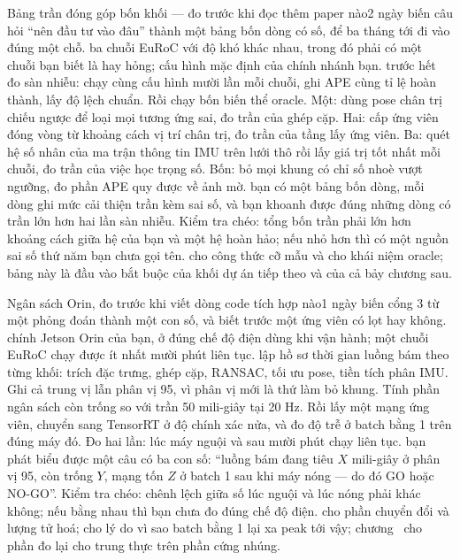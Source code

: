 \documentclass[../../deep_learning.tex]{subfiles}
\begin{document}
\begin{duan}{Bảng trần đóng góp bốn khối --- đo trước khi đọc thêm paper nào}{2 ngày}
\dmt biến câu hỏi ``nên đầu tư vào đâu'' thành một bảng bốn dòng có số, để ba tháng tới đi vào đúng một chỗ.
\ddl ba chuỗi EuRoC với độ khó khác nhau, trong đó phải có một chuỗi bạn biết là hay hỏng; cấu hình mặc định của chính nhánh bạn.
\dbc trước hết đo sàn nhiễu: chạy cùng cấu hình mười lần mỗi chuỗi, ghi APE cùng tỉ lệ hoàn thành, lấy độ lệch chuẩn. Rồi chạy bốn biến thể oracle. Một: dùng pose chân trị chiếu ngược để loại mọi tương ứng sai, đo trần của ghép cặp. Hai: cấp ứng viên đóng vòng từ khoảng cách vị trí chân trị, đo trần của tầng lấy ứng viên. Ba: quét hệ số nhân của ma trận thông tin IMU trên lưới thô rồi lấy giá trị tốt nhất mỗi chuỗi, đo trần của việc học trọng số. Bốn: bỏ mọi khung có chỉ số nhoè vượt ngưỡng, đo phần APE quy được về ảnh mờ.
\dxk bạn có một bảng bốn dòng, mỗi dòng ghi mức cải thiện trần kèm sai số, và bạn khoanh được đúng những dòng có trần lớn hơn hai lần sàn nhiễu. Kiểm tra chéo: tổng bốn trần phải lớn hơn khoảng cách giữa hệ của bạn và một hệ hoàn hảo; nếu nhỏ hơn thì có một nguồn sai số thứ năm bạn chưa gọi tên.
\dnv {} cho công thức cỡ mẫu và cho khái niệm oracle; bảng này là đầu vào bắt buộc của khối dự án tiếp theo và của cả bảy chương sau.
\end{duan}

\begin{duan}{Ngân sách Orin, đo trước khi viết dòng code tích hợp nào}{1 ngày}
\dmt biến cổng 3 từ một phỏng đoán thành một con số, và biết trước một ứng viên có lọt hay không.
\ddl chính Jetson Orin của bạn, ở đúng chế độ điện dùng khi vận hành; một chuỗi EuRoC chạy được ít nhất mười phút liên tục.
\dbc lập hồ sơ thời gian luồng bám theo từng khối: trích đặc trưng, ghép cặp, RANSAC, tối ưu pose, tiền tích phân IMU. Ghi cả trung vị lẫn phân vị 95, vì phân vị mới là thứ làm bỏ khung. Tính phần ngân sách còn trống so với trần 50 mili-giây tại 20 Hz. Rồi lấy một mạng ứng viên, chuyển sang TensorRT ở độ chính xác nửa, và đo độ trễ ở batch bằng 1 trên đúng máy đó. Đo hai lần: lúc máy nguội và sau mười phút chạy liên tục.
\dxk bạn phát biểu được một câu có ba con số: ``luồng bám đang tiêu \(X\) mili-giây ở phân vị 95, còn trống \(Y\), mạng tốn \(Z\) ở batch 1 sau khi máy nóng --- do đó GO hoặc NO-GO''. Kiểm tra chéo: chênh lệch giữa số lúc nguội và lúc nóng phải khác không; nếu bằng nhau thì bạn chưa đo đúng chế độ điện.
\dnv {} cho phần chuyển đổi và lượng tử hoá;  cho lý do vì sao batch bằng 1 lại xa peak tới vậy; chương~ cho phần đo lại cho trung thực trên phần cứng nhúng.
\end{duan}
\end{document}
